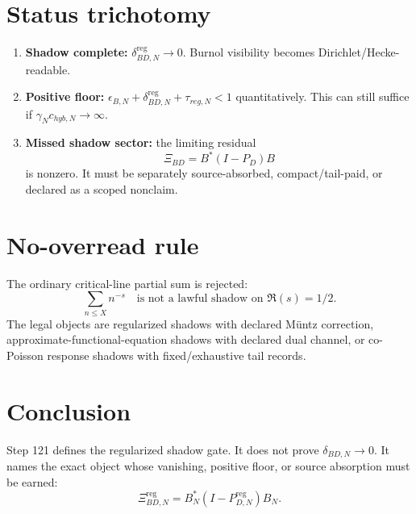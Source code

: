 \documentclass[11pt]{article}
\begin{document}
\section{Status trichotomy}
\begin{enumerate}[label=\textbf{S\arabic*.}]
\item \textbf{Shadow complete:} \(\delta_{BD,N}^{\mathrm{reg}}\to0\). Burnol visibility becomes Dirichlet/Hecke-readable.
\item \textbf{Positive floor:} \(\epsilon_{B,N}+\delta_{BD,N}^{\mathrm{reg}}+\tau_{reg,N}<1\) quantitatively. This can still suffice if \(\gamma_Nc_{hyb,N}\to\infty\).
\item \textbf{Missed shadow sector:} the limiting residual
\[
\Xi_{BD}=B^*(I-P_D)B
\]
is nonzero. It must be separately source-absorbed, compact/tail-paid, or declared as a scoped nonclaim.
\end{enumerate}

\section{No-overread rule}
The ordinary critical-line partial sum is rejected:
\[
\sum_{n\le X} n^{-s}
\quad\text{is not a lawful shadow on }\Re(s)=1/2.
\]
The legal objects are regularized shadows with declared M\"untz correction, approximate-functional-equation shadows with declared dual channel, or co-Poisson response shadows with fixed/exhaustive tail records.

\section{Conclusion}
Step 121 defines the regularized shadow gate. It does not prove \(\delta_{BD,N}\to0\). It names the exact object whose vanishing, positive floor, or source absorption must be earned:
\[
\Xi_{BD,N}^{\mathrm{reg}}=B_N^*(I-P_{D,N}^{\mathrm{reg}})B_N.
\]
\end{document}

